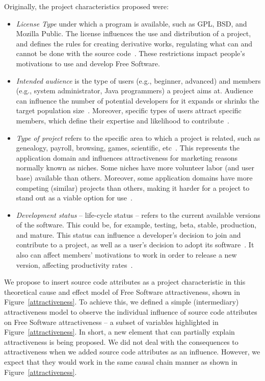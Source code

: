 \documentclass[conference]{IEEEtran}
\begin{document}
Originally, the project characteristics proposed were:
\begin{itemize}
%
\item \emph{License Type} under which a program is available, such as GPL, BSD, 
and Mozilla Public.
%
The license influences the use and distribution of a project, and defines the rules for 
creating derivative works, regulating what can and cannot be done with the
source code~\cite{Santos2010}. These restrictions impact people's motivations
to use and develop Free Software.

%
\item \emph{Intended audience} is the type of users (e.g., beginner, advanced)
and members (e.g., system administrator, Java programmers) a project aims at.
%
Audience can influence the number of potential developers for it expands or
shrinks the target population size~\cite{johnson2002}.
%
Moreover, specific types of users attract specific members, which define their expertise
and likelihood to contribute~\cite{Santos2010}.

%
\item \emph{Type of project} refers to the specific area to which a project is related, 
such as genealogy, payroll, browsing, games, scientific, etc~\cite{Crowston2002}.
%
This represents the application domain and influences attractiveness for
marketing reasons normally known as niches.
%
Some niches have more volunteer labor (and user base) available than others.
%
Moreover, some application domains have more competing (similar) projects than
others, making it harder for a project to stand out as a viable option for
use~\cite{johnson2002}.
%
\item \emph{Development status} -- life-cycle status -- refers to the current 
available versions of the software. 
%
This could be, for example, testing, beta, stable, production, and mature.
%
This status can influence a developer's decision to join and contribute to a
project, as well as a user's decision to adopt its software~\cite{Santos2010}.
%
It also can affect members' motivations to work in order to release a new version,
affecting productivity rates~\cite{raja2006,Stewart2006}. 

\end{itemize}

We propose to insert source code attributes as a project
characteristic in this theoretical cause and effect model of Free Software
attractiveness, shown in Figure~\ref{attractiveness}.
%
To achieve this, we defined a simple (intermediary) attractiveness model
to observe the individual influence of source code attributes on Free
Software attractiveness -- a subset of variables highlighted in
Figure~\ref{attractiveness}.
%
In short, a new element that can partially explain attractiveness is being proposed.
%
We did not deal with the consequences to attractiveness when we added source
code attributes as an influence.
%
However, we expect that they would work in the same causal chain manner
as shown in Figure~\ref{attractiveness}.
\end{document}
